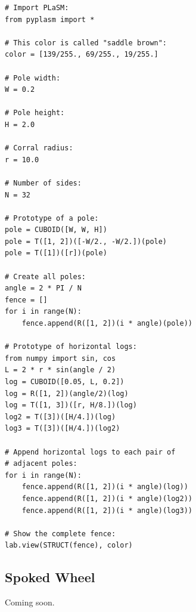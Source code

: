 \documentclass[article,A4,12pt]{llncs}
\begin{document}
\begin{verbatim}
# Import PLaSM:
from pyplasm import *

# This color is called "saddle brown":
color = [139/255., 69/255., 19/255.]

# Pole width:
W = 0.2

# Pole height:
H = 2.0

# Corral radius:
r = 10.0

# Number of sides:
N = 32

# Prototype of a pole:
pole = CUBOID([W, W, H])
pole = T([1, 2])([-W/2., -W/2.])(pole)
pole = T([1])([r])(pole)
 
# Create all poles:
angle = 2 * PI / N
fence = []
for i in range(N):
    fence.append(R([1, 2])(i * angle)(pole))
    
# Prototype of horizontal logs:
from numpy import sin, cos
L = 2 * r * sin(angle / 2)
log = CUBOID([0.05, L, 0.2])
log = R([1, 2])(angle/2)(log)
log = T([1, 3])([r, H/8.])(log)  
log2 = T([3])([H/4.])(log)
log3 = T([3])([H/4.])(log2)

# Append horizontal logs to each pair of 
# adjacent poles:
for i in range(N):
    fence.append(R([1, 2])(i * angle)(log))
    fence.append(R([1, 2])(i * angle)(log2))
    fence.append(R([1, 2])(i * angle)(log3))

# Show the complete fence:
lab.view(STRUCT(fence), color)
\end{verbatim}

\subsection{Spoked Wheel}

Coming soon.
\end{document}
